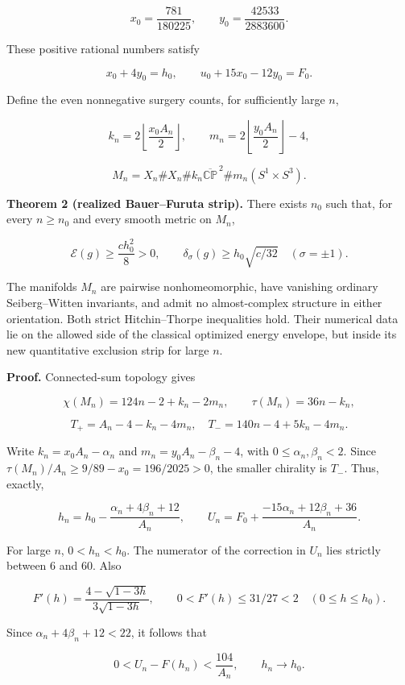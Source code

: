 \documentclass[
  10pt,
]{article}
\begin{document}
\[
 x_0=\frac{781}{180225},\qquad y_0=\frac{42533}{2883600}.
 \tag{11}
\]

These positive rational numbers satisfy

\[
 x_0+4y_0=h_0,\qquad u_0+15x_0-12y_0=F_0.
 \tag{12}
\]

Define the even nonnegative surgery counts, for sufficiently large
\(n\),

\[
 k_n=2\left\lfloor\frac{x_0A_n}{2}\right\rfloor,
 \qquad m_n=2\left\lfloor\frac{y_0A_n}{2}\right\rfloor-4,
\]

\[
 M_n=X_n\#X_n\#k_n\overline{\mathbb{CP}}^{\,2}
                    \#m_n(S^1\times S^3).
 \tag{13}
\]

\textbf{Theorem 2 (realized Bauer--Furuta strip).} There exists \(n_0\)
such that, for every \(n\ge n_0\) and every smooth metric on \(M_n\),

\[
 \boxed{\mathcal E(g)\ge\frac{c h_0^2}{8}>0,\qquad
 \delta_\sigma(g)\ge h_0\sqrt{c/32}\quad(\sigma=\pm1).}
 \tag{14}
\]

The manifolds \(M_n\) are pairwise nonhomeomorphic, have vanishing
ordinary Seiberg--Witten invariants, and admit no almost-complex
structure in either orientation. Both strict Hitchin--Thorpe
inequalities hold. Their numerical data lie on the allowed side of the
classical optimized energy envelope, but inside its new quantitative
exclusion strip for large \(n\).

\textbf{Proof.} Connected-sum topology gives

\[
 \chi(M_n)=124n-2+k_n-2m_n,\qquad \tau(M_n)=36n-k_n,
\]

\[
 T_+=A_n-4-k_n-4m_n,
 \quad T_-=140n-4+5k_n-4m_n.
 \tag{15}
\]

Write \(k_n=x_0A_n-\alpha_n\) and \(m_n=y_0A_n-\beta_n-4\), with
\(0\le\alpha_n,\beta_n<2\). Since
\(\tau(M_n)/A_n\ge9/89-x_0=196/2025>0\), the smaller chirality is
\(T_-\). Thus, exactly,

\[
 h_n=h_0-\frac{\alpha_n+4\beta_n+12}{A_n},\qquad
 U_n=F_0+\frac{-15\alpha_n+12\beta_n+36}{A_n}.
 \tag{16}
\]

For large \(n\), \(0<h_n<h_0\). The numerator of the correction in
\(U_n\) lies strictly between 6 and 60. Also

\[
 F'(h)=\frac{4-\sqrt{1-3h}}{3\sqrt{1-3h}},\qquad
 0<F'(h)\le31/27<2\quad(0\le h\le h_0).
\]

Since \(\alpha_n+4\beta_n+12<22\), it follows that

\[
 \boxed{0<U_n-F(h_n)<\frac{104}{A_n},\qquad h_n\longrightarrow h_0.}
 \tag{17}
\]
\end{document}
